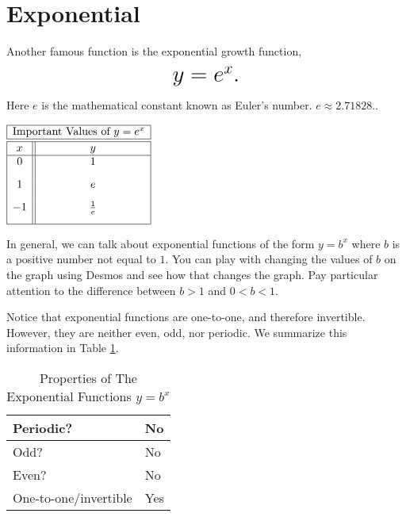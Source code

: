 \documentclass[nooutcomes]{ximera}
\begin{document}
\section{Exponential}
Another famous function is the exponential growth function, $$ \mbox{\huge $y=e^{x}.$}$$ 

Here $e$ is the mathematical constant known as Euler's number.  $e \approx 2.71828 .$.

\begin{image}
\end{image}

\begin{center}
\(
\begin{array}{ |c || c|  }
 \hline
 \multicolumn{2}{|c|}{\text{\normalfont Important Values of } y=e^x} \\
\hline
 \hline
 x & y\\
 \hline
 0&1\\[2ex]
 1&e\\[2ex]
 -1&\frac{1}{e}\\[2ex]
 \hline
\end{array}
\)
\end{center}

In general, we can talk about exponential functions of the form $y=b^{x}$ where $b$ is a positive number not equal to $1$.  You can play with changing the values of $b$ on the graph using Desmos and see how that changes the graph.  Pay particular attention to the difference between $b>1$ and $0<b<1$.

\begin{center}  
\end{center}

Notice that exponential functions are one-to-one, and therefore invertible. However, they are neither even, odd, nor periodic. We summarize this information in Table \ref{tab:expproperties}.

\begin{table}[h]
\caption{\label{tab:expproperties}Properties of The Exponential Functions $y = b^{x}$}
\centering
\begin{tabular}{l|l}
Periodic? & No\\ \hline
Odd? &  No \\ \hline
Even? & No \\ \hline
One-to-one/invertible & Yes
\end{tabular}
\end{table}
\end{document}
